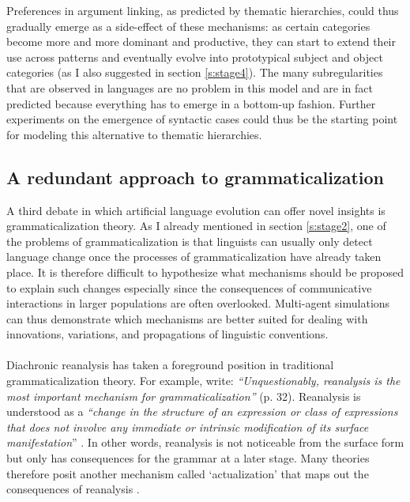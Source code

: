 Preferences in argument linking, as predicted by thematic hierarchies, could thus gradually emerge as a side-effect of these mechanisms: as certain categories become more and more dominant and productive, they can start to extend their use across patterns and eventually evolve into prototypical subject and object categories (as I also suggested in section \ref{s:stage4}). The many subregularities that are observed in languages are no problem in this model and are in fact predicted because everything has to emerge in a bottom-up fashion. Further experiments on the emergence of syntactic cases could thus be the starting point for modeling this alternative to thematic hierarchies.

\subsection{A redundant approach to grammaticalization}
\label{s:actualization}

A third debate in which artificial language evolution can offer novel insights is grammaticalization theory. As I already mentioned in section \ref{s:stage2}, one of the problems of grammaticalization is that linguists can usually only detect language change once the processes of grammaticalization have already taken place. It is therefore difficult to hypothesize what mechanisms should be proposed to explain such changes especially since the consequences of communicative interactions in larger populations are often overlooked. Multi-agent simulations can thus demonstrate which mechanisms are better suited for dealing with innovations, variations, and propagations of linguistic conventions.
\\
\\
 Diachronic reanalysis has taken a foreground position in traditional grammaticalization theory. For example, \citet{hopper93grammaticalization} write: {\em ``Unquestionably, reanalysis is the most important mechanism for grammaticalization''} (p. 32). Reanalysis is understood as a {\em ``change in the structure of an expression or class of expressions that does not involve any immediate or intrinsic modification of its surface manifestation}'' \citep[p. 59]{langacker77syntactic}. In other words, reanalysis is not noticeable from the surface form but only has consequences for the grammar at a later stage. Many theories therefore posit another mechanism called `actualization' that maps out the consequences of reanalysis \citep{timberlake77reanalysis}.

